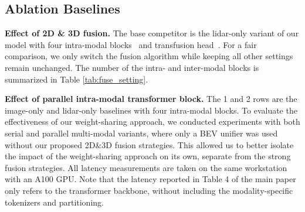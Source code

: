 \documentclass[10pt,twocolumn,letterpaper]{article}
\begin{document}
\subsection{Ablation Baselines}
\noindent \textbf{Effect of 2D \& 3D fusion.} The base competitor is the lidar-only variant of our model with four intra-modal blocks~\cite{wang2023dsvt} and transfusion head~\cite{bai2022transfusion}. For a fair comparison, we only switch the fusion algorithm while keeping all other settings remain unchanged. The number of the intra- and inter-modal blocks is summarized in Table \ref{tab:fuse_setting}.

\begin{table}[h]
\centering
{}
\vspace{-4pt}
\caption{The number of the intra- and inter-modal blocks on the ablation of 2D \& 3D fusion. Camera~(C), LiDAR~(L).}
\label{tab:fuse_setting}
\vspace{-4pt}
\end{table}


\noindent \textbf{Effect of parallel intra-modal transformer block.} The 1 and 2 rows are the image-only and lidar-only baselines with four intra-modal blocks. To evaluate the effectiveness of our weight-sharing approach, we conducted experiments with both serial and parallel multi-modal variants, where only a BEV unifier was used without our proposed 2D\&3D fusion strategies. This allowed us to better isolate the impact of the weight-sharing approach on its own, separate from the strong fusion strategies. All latency measurements are taken on the same workstation with an A100 GPU. Note that the latency reported in Table {\color{red}4} of the main paper only refers to the transformer backbone, without including the modality-specific tokenizers and partitioning.
\end{document}
